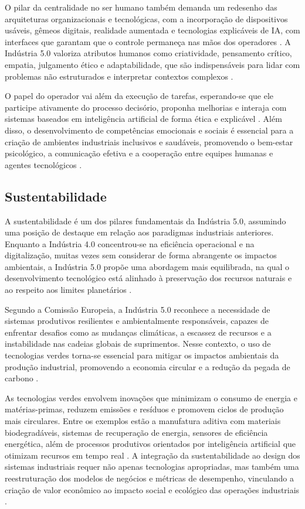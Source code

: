 O pilar da centralidade no ser humano também demanda um redesenho das arquiteturas organizacionais e tecnológicas, com a incorporação de dispositivos usáveis, gêmeos digitais, realidade aumentada e tecnologias explicáveis de IA, com interfaces que garantam que o controle permaneça nas mãos dos operadores \cite{TOTH2023, YANG2024}. A Indústria 5.0 valoriza atributos humanos como criatividade, pensamento crítico, empatia, julgamento ético e adaptabilidade, que são indispensáveis para lidar com problemas não estruturados e interpretar contextos complexos \cite{RANNERTSHAUSER2022, Nahavandi2019}.

O papel do operador vai além da execução de tarefas, esperando-se que ele participe ativamente do processo decisório, proponha melhorias e interaja com sistemas baseados em inteligência artificial de forma ética e explicável \cite{TOTH2023, PIZON2023}. Além disso, o desenvolvimento de competências emocionais e sociais é essencial para a criação de ambientes industriais inclusivos e saudáveis, promovendo o bem-estar psicológico, a comunicação efetiva e a cooperação entre equipes humanas e agentes tecnológicos \cite{Santana_2023}.

\subsection{Sustentabilidade}

A sustentabilidade é um dos pilares fundamentais da Indústria 5.0, assumindo uma posição de destaque em relação aos paradigmas industriais anteriores. Enquanto a Indústria 4.0 concentrou-se na eficiência operacional e na digitalização, muitas vezes sem considerar de forma abrangente os impactos ambientais, a Indústria 5.0 propõe uma abordagem mais equilibrada, na qual o desenvolvimento tecnológico está alinhado à preservação dos recursos naturais e ao respeito aos limites planetários \cite{VALETTE2023, silva2024, Rame2024}.

Segundo a Comissão Europeia, a Indústria 5.0 reconhece a necessidade de sistemas produtivos resilientes e ambientalmente responsáveis, capazes de enfrentar desafios como as mudanças climáticas, a escassez de recursos e a instabilidade nas cadeias globais de suprimentos. Nesse contexto, o uso de tecnologias verdes torna-se essencial para mitigar os impactos ambientais da produção industrial, promovendo a economia circular e a redução da pegada de carbono \cite{Rame2024}.

As tecnologias verdes envolvem inovações que minimizam o consumo de energia e matérias-primas, reduzem emissões e resíduos e promovem ciclos de produção mais circulares. Entre os exemplos estão a manufatura aditiva com materiais biodegradáveis, sistemas de recuperação de energia, sensores de eficiência energética, além de processos produtivos orientados por inteligência artificial que otimizam recursos em tempo real \cite{TOTH2023, silva2024}. A integração da sustentabilidade ao design dos sistemas industriais requer não apenas tecnologias apropriadas, mas também uma reestruturação dos modelos de negócios e métricas de desempenho, vinculando a criação de valor econômico ao impacto social e ecológico das operações industriais \cite{Santos2025}.

